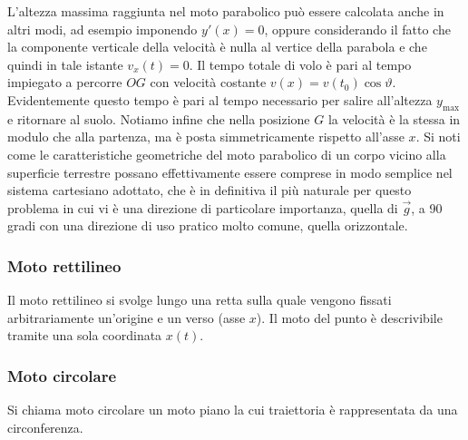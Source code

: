L'altezza massima raggiunta nel moto parabolico può essere calcolata anche in altri modi, ad esempio imponendo $y'(x)=0$, oppure considerando il fatto che la componente verticale della velocità è nulla al vertice della parabola e che quindi in tale istante $v_x(t)=0$. Il tempo totale di volo è pari al tempo impiegato a percorre $OG$ con velocità costante $v(x)=v(t_0 )\cos\vartheta$. Evidentemente questo tempo è pari al tempo necessario per salire all'altezza $y_{\text{max}}$ e ritornare al suolo. Notiamo infine che nella posizione $G$ la velocità è la stessa in modulo che alla partenza, ma è posta simmetricamente rispetto all'asse $x$. Si noti come le caratteristiche geometriche del moto parabolico di un corpo vicino alla superficie terrestre possano effettivamente essere comprese in modo semplice nel sistema cartesiano adottato, che è in definitiva il più naturale per questo problema in cui vi è una direzione di particolare importanza, quella di $\vec{g}$, a 90 gradi con una direzione di uso pratico molto comune, quella orizzontale.

\subsubsection{Moto rettilineo}

Il moto rettilineo si svolge lungo una retta sulla quale vengono fissati arbitrariamente un'origine e un verso (asse $x$). Il moto del punto è descrivibile tramite una sola coordinata $x(t)$.

\subsubsection{Moto circolare}

Si chiama moto circolare un moto piano la cui traiettoria è rappresentata da una circonferenza.\\

